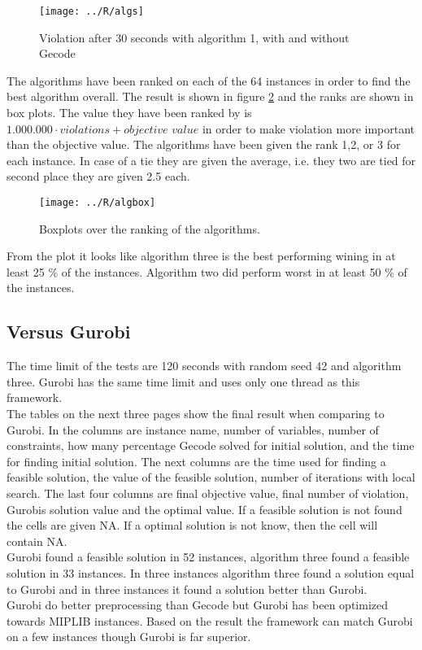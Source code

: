 \begin{figure}[!h]
\centerline{
\texttt{[image: ../R/algs]}} \caption{Violation after 30 seconds with 
algorithm 1, with and without Gecode}\label{fig_algs}
\end{figure}\noindent
\newpage\noindent
The algorithms have been ranked on each of the 64 instances in order to find the best algorithm overall. The result is 
shown in figure \ref{fig_boxplot} and the ranks are shown in box plots. The value they have been ranked by is 
$1.000.000\cdot violations + objective$ $value$ in order to make violation more important than the objective value. The 
algorithms have been given the rank 1,2, or 3 for each instance. In case of a tie they are given the average, i.e. they 
two are tied for second place they are given 2.5 each. \\
\begin{figure}[!h]
\centering
\texttt{[image: ../R/algbox]} \caption{Boxplots over the ranking of the 
algorithms.}\label{fig_boxplot}
\end{figure}\noindent
From the plot it looks like algorithm three is the best performing wining in at least 25 \% of the instances. Algorithm 
two did perform worst in at least 50 \% of the instances. \\ 
\subsection{Versus Gurobi}
The time limit of the tests are 120 seconds with random seed 42 and algorithm three. Gurobi has the same time limit and 
uses only one thread as this framework. \\ 
The tables on the next three pages show the final result when comparing to Gurobi. In the columns are instance name, 
number of variables, number of constraints, how many percentage Gecode solved for initial solution, and the time for 
finding initial solution. The next columns are the time used for finding a feasible solution, the value of the feasible 
solution, number of iterations with local search. The last four columns are final objective value, final number of 
violation, Gurobis solution value and the optimal value. If a feasible solution is not found the cells are given NA. 
If a optimal solution is not know, then the cell will contain NA. \\ 
Gurobi found a feasible solution in 52 instances, algorithm three found a feasible solution in 33 instances. In three 
instances algorithm three found a solution equal to Gurobi and in three instances it found a solution better than 
Gurobi. \\
Gurobi do better preprocessing than Gecode but Gurobi has been optimized towards MIPLIB instances. Based on the result 
the framework can match Gurobi on a few instances though Gurobi is far superior. 


